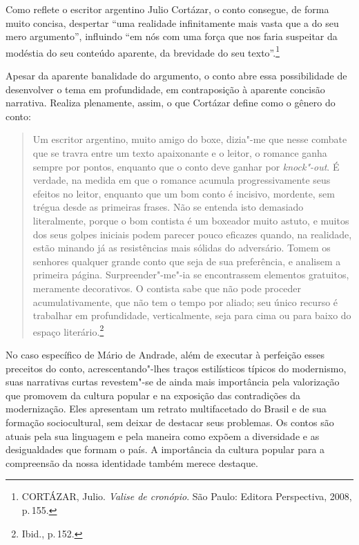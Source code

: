 Como reflete o escritor argentino Julio Cortázar, o conto consegue, de forma muito concisa, despertar ``uma realidade infinitamente mais vasta que a do seu mero argumento'', influindo ``em nós com uma força que nos faria suspeitar da modéstia do seu conteúdo aparente, da brevidade do seu texto''.\footnote{\textsc{CORTÁZAR}, Julio. \textit{Valise de cronópio}. São Paulo: Editora Perspectiva, 2008, p.\,155.}

Apesar da aparente banalidade do argumento, o conto abre essa possibilidade de desenvolver o tema em profundidade, em contraposição à aparente concisão narrativa. Realiza plenamente, assim, o que Cortázar define como o gênero do conto:

\begin{quote}
Um escritor argentino, muito amigo do boxe, dizia"-me que nesse combate que se travra entre um texto apaixonante e o leitor, o romance ganha sempre por pontos, enquanto que o conto deve ganhar por \textit{knock"-out}. É verdade, na medida em que o romance acumula progressivamente seus efeitos no leitor, enquanto que um bom conto é incisivo, mordente, sem trégua desde as primeiras frases. Não se entenda isto demasiado literalmente, porque o bom contista é um boxeador muito astuto, e muitos dos seus golpes iniciais podem parecer pouco eficazes quando, na realidade, estão minando já as resistências mais sólidas do adversário.
Tomem os senhores qualquer grande conto que seja de sua preferência, e analisem a primeira página. Surpreender"-me"-ia se encontrassem elementos gratuitos, meramente decorativos. O contista sabe que não pode proceder acumulativamente, que não tem o tempo por aliado; seu único recurso é trabalhar em profundidade, verticalmente, seja para cima ou para baixo do espaço literário.\footnote{Ibid., p.\,152.}
\end{quote}

No caso específico de Mário de Andrade, além de executar à perfeição esses preceitos do conto, acrescentando"-lhes traços estilísticos típicos do modernismo, 
suas narrativas curtas revestem"-se de ainda mais importância pela
valorização que promovem da cultura popular e na
exposição das contradições da modernização. Eles apresentam um retrato
multifacetado do Brasil e de sua formação sociocultural, sem deixar de
destacar seus problemas. Os contos são atuais pela sua linguagem e pela
maneira como expõem a diversidade e as desigualdades que formam o país.
A importância da cultura popular para a compreensão da nossa identidade
também merece destaque.

